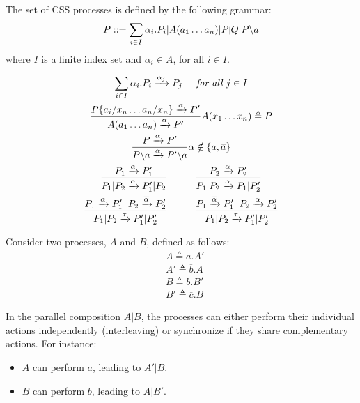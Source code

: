 The set of CSS processes is defined by the following grammar:
\begin{equation}
    P ::= \sum_{i\in I}\alpha_i.P_i|A(a_1\ldots a_n)|P \scalebox{0.8}{$|$} Q|P\backslash a
\end{equation}
where $I$ is a finite index set and $\alpha_i\in A$, for all $i\in I$.

\begin{gather}
    \sum_{i\in I}\alpha_i.P_i\xrightarrow{\alpha_j}P_j\hspace{.5cm}\textit{for all }j\in I\\
    \frac{P\{a_i/x_n\ldots a_n/x_n\}\xrightarrow{\alpha}P'}{A(a_1\ldots a_n)\xrightarrow{\alpha}P'}A(x_1\ldots x_n)\triangleq P\\
    \frac{P\xrightarrow{\alpha}P'}{P\backslash a\xrightarrow{\alpha}P'\backslash a}\alpha\notin\{a, \overline{a}\}\\
    \frac{P_1\xrightarrow{\alpha}P_1'}{P_1|P_2\xrightarrow{\alpha}P_1'|P_2}\hspace{1cm}
    \frac{P_2\xrightarrow{\alpha}P_2'}{P_1|P_2\xrightarrow{\alpha}P_1|P_2'}\\
    \frac{P_1\xrightarrow{\alpha}P_1'\hspace{.2cm}P_2\xrightarrow{\overline{\alpha}}P_2'}{P_1|P_2\xrightarrow{\tau}P_1'|P_2'}\hspace{1cm}\frac{P_1\xrightarrow{\overline{\alpha}}P_1'\hspace{.2cm}P_2\xrightarrow{\alpha}P_2'}{P_1|P_2\xrightarrow{\tau}P_1'|P_2'}
\end{gather}

Consider two processes, $A$ and $B$, defined as follows:
\begin{align*}
    &A\triangleq a.A'\\
    &A'\triangleq \overline{b}.A\\
    &B\triangleq b.B'\\
    &B'\triangleq \overline{c}.B
\end{align*}

In the parallel composition $A|B$, the processes can either perform their individual actions independently (interleaving) or synchronize if they share complementary actions. For instance:
\begin{itemize}
    \item $A$ can perform $a$, leading to $A'|B$.
    \item $B$ can perform $b$, leading to $A|B'$.
\end{itemize}


